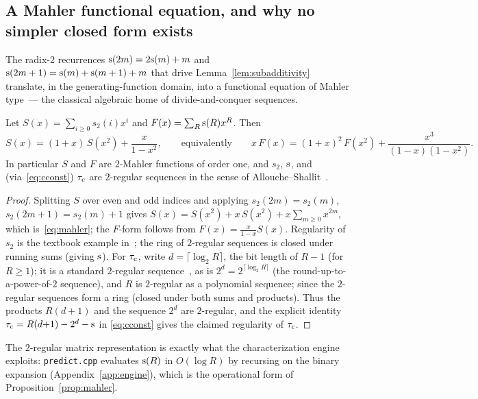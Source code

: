 \subsection{A Mahler functional equation, and why no simpler closed form exists}

The radix-2 recurrences $\mathrm{s}(2m) = 2\mathrm{s}(m) + m$ and
$\mathrm{s}(2m+1) = \mathrm{s}(m) + \mathrm{s}(m+1) + m$ that drive
Lemma~\ref{lem:subadditivity} translate, in the generating-function domain,
into a functional equation of Mahler type~--- the classical algebraic home of
divide-and-conquer sequences.

\begin{proposition}\label{prop:mahler}
	Let $S(x) = \sum_{i\ge0} s_2(i)x^i$ and $F(x) = \sum_R \mathrm{s}(R) x^R$. Then
	\begin{equation}\label{eq:mahler}
		S(x) = (1+x)\, S(x^2) + \frac{x}{1-x^2},
		\qquad\text{equivalently}\qquad
		x\,F(x) = (1+x)^2\, F(x^2) + \frac{x^3}{(1-x)(1-x^2)} .
	\end{equation}
	In particular $S$ and $F$ are $2$-Mahler functions of order one, and
	$s_2$, $\mathrm{s}$, and (via~\eqref{eq:cconst}) $\tau_{\mathrm{c}}$ are $2$-regular
	sequences in the sense of
	Allouche--Shallit~\cite{allouche1992ring,allouche2003automatic}.
\end{proposition}

\begin{proof}
	Splitting $S$ over even and odd indices and applying
	$s_2(2m) = s_2(m)$, $s_2(2m+1) = s_2(m) + 1$ gives
	$S(x) = S(x^2) + x\,S(x^2) + x\sum_{m\ge0} x^{2m}$, which
	is~\eqref{eq:mahler}; the $F$-form follows from
	$F(x) = \frac{x}{1-x} S(x)$. Regularity of $s_2$ is the textbook example
	in~\cite{allouche1992ring}; the ring of $2$-regular sequences is closed
	under running sums (giving $\mathrm{s}$). For $\tau_{\mathrm{c}}$, write
	$d = \lceil \log_2 R \rceil$, the bit length of $R-1$ (for $R \ge 1$); it is a
	standard $2$-regular sequence~\cite{allouche1992ring}, as is
	$2^{d} = 2^{\lceil \log_2 R \rceil}$ (the round-up-to-a-power-of-$2$
	sequence), and $R$ is $2$-regular as a polynomial sequence; since the
	$2$-regular sequences form a ring (closed under both sums and products).
	Thus the products $R(d{+}1)$ and the sequence $2^d$ are $2$-regular, and
	the explicit identity $\tau_{\mathrm{c}} = R(d{+}1) - 2^d - \mathrm{s}$ in
	\eqref{eq:cconst} gives the claimed regularity of $\tau_{\mathrm{c}}$.
\end{proof}

The $2$-regular matrix representation is exactly what the characterization
engine exploits: \texttt{predict.cpp} evaluates $\mathrm{s}(R)$ in $O(\log R)$ by
recursing on the binary expansion (Appendix~\ref{app:engine}), which is the
operational form of Proposition~\ref{prop:mahler}.

